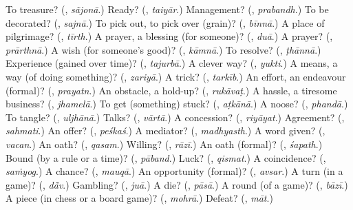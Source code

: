 \begin{tcolorbox}[breakable,colback=teal!4,colframe=teal!35!black,title={Before you move on}]
To treasure? (\textbf{}, \emph{sãjonā}.) Ready? (\textbf{}, \emph{taiyār}.) Management? (\textbf{}, \emph{prabandh}.) To be decorated? (\textbf{}, \emph{sajnā}.) To pick out, to pick over (grain)? (\textbf{}, \emph{bīnnā}.) A place of pilgrimage? (\textbf{}, \emph{tīrth}.) A prayer, a blessing (for someone)? (\textbf{}, \emph{duā}.) A prayer? (\textbf{}, \emph{prārthnā}.) A wish (for someone's good)? (\textbf{}, \emph{kāmnā}.) To resolve? (\textbf{}, \emph{ṭhānnā}.) Experience (gained over time)? (\textbf{}, \emph{tajurbā}.) A clever way? (\textbf{}, \emph{yukti}.) A means, a way (of doing something)? (\textbf{}, \emph{zariyā}.) A trick? (\textbf{}, \emph{tarkīb}.) An effort, an endeavour (formal)? (\textbf{}, \emph{prayatn}.) An obstacle, a hold-up? (\textbf{}, \emph{rukāvaṭ}.) A hassle, a tiresome business? (\textbf{}, \emph{jhamelā}.) To get (something) stuck? (\textbf{}, \emph{aṭkānā}.) A noose? (\textbf{}, \emph{phandā}.) To tangle? (\textbf{}, \emph{uljhānā}.) Talks? (\textbf{}, \emph{vārtā}.) A concession? (\textbf{}, \emph{riyāyat}.) Agreement? (\textbf{}, \emph{sahmati}.) An offer? (\textbf{}, \emph{peśkaś}.) A mediator? (\textbf{}, \emph{madhyasth}.) A word given? (\textbf{}, \emph{vacan}.) An oath? (\textbf{}, \emph{qasam}.) Willing? (\textbf{}, \emph{rāzī}.) An oath (formal)? (\textbf{}, \emph{śapath}.) Bound (by a rule or a time)? (\textbf{}, \emph{pāband}.) Luck? (\textbf{}, \emph{qismat}.) A coincidence? (\textbf{}, \emph{saṁyog}.) A chance? (\textbf{}, \emph{mauqā}.) An opportunity (formal)? (\textbf{}, \emph{avsar}.) A turn (in a game)? (\textbf{}, \emph{dā̃v}.) Gambling? (\textbf{}, \emph{juā}.) A die? (\textbf{}, \emph{pāsā}.) A round (of a game)? (\textbf{}, \emph{bāzī}.) A piece (in chess or a board game)? (\textbf{}, \emph{mohrā}.) Defeat? (\textbf{}, \emph{māt}.)
\end{tcolorbox}
